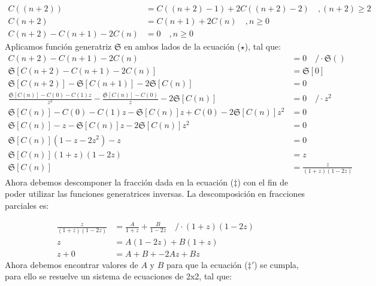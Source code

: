 \begin{solution}
\begin{align*}
    C((n+2)) &= C((n+2)-1) + 2C((n+2)-2) \quad , (n+2) \ge 2 \\
    C(n+2) &= C(n+1) + 2C(n) \quad , n \ge 0\\
    C(n+2) - C(n+1) - 2C(n)  &= 0 \quad , n \ge 0 \tag{$\star$}
\end{align*}
Aplicamos función generatriz $\mathfrak{S}$ en ambos lados de la ecuación ($\star$), tal que:
\begin{align*}
    C(n+2) - C(n+1) - 2C(n) &= 0 \quad \text{/}\cdot \mathfrak{S}()\\
    \mathfrak{S}\left[ C(n+2) - C(n+1) - 2C(n) \right] &= \mathfrak{S}[0]\\
    \mathfrak{S}\left[ C(n+2) \right] - \mathfrak{S}\left[ C(n+1) \right] - 2\mathfrak{S}\left[ C(n) \right] &=0 \\
    \frac{\mathfrak{S}\left[ C(n) \right] - C(0) -C(1)z}{z^2} - \frac{\mathfrak{S}\left[ C(n)\right]-C(0)}{z} - 2 \mathfrak{S}\left[ C(n) \right] &= 0 \quad \text{/}\cdot z^2\\
    \mathfrak{S}\left[ C(n) \right] - C(0) -C(1)z -\mathfrak{S}\left[ C(n) \right]z+C(0) -2\mathfrak{S}\left[ C(n) \right]z^2 &=0 \\
    \mathfrak{S}\left[ C(n) \right] -z -\mathfrak{S}\left[ C(n) \right]z -2\mathfrak{S}\left[ C(n) \right]z^2 &=0 \\
    \mathfrak{S}\left[ C(n) \right](1 -z -2z^2) -z &=0 \\
    \mathfrak{S}\left[ C(n) \right](1+z)(1-2z) &=z \\
    \mathfrak{S}\left[ C(n) \right] &=\frac{z}{(1+z)(1-2z)} \tag{$\ddagger$}
\end{align*}
Ahora debemos descomponer la fracción dada en la ecuación ($\ddagger$) con el fin de poder utilizar las funciones generatrices inversas. La descomposición en fracciones parciales es:

\begin{align*}
    \frac{z}{(1+z)(1-2z)} &= \frac{A}{1+z}+ \frac{B}{1-2z} \quad \text{/}\cdot (1+z)(1-2z) \\
    z &= A(1-2z) + B(1+z) \\
    z + 0 &= A + B + -2Az + Bz \tag{$\ddagger'$}
\end{align*}
Ahora debemos encontrar valores de $A$ y $B$ para que la ecuación ($\ddagger'$) se cumpla, para ello se resuelve un sistema de ecuaciones de 2x2, tal que:


\end{solution}
